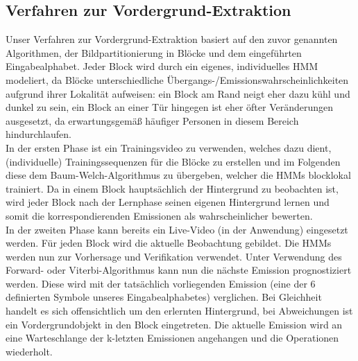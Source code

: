 \subsection{Verfahren zur Vordergrund-Extraktion}
\label{sec:verfahren}

Unser Verfahren zur Vordergrund-Extraktion basiert auf den zuvor genannten  Algorithmen, der Bildpartitionierung in Blöcke und dem eingeführten Eingabealphabet.
Jeder Block wird durch ein eigenes, individuelles HMM modeliert, da Blöcke unterschiedliche Übergangs-/Emissionswahrscheinlichkeiten aufgrund ihrer Lokalität aufweisen: ein Block am Rand neigt eher dazu kühl und dunkel zu sein, ein Block an einer Tür hingegen ist eher öfter Veränderungen ausgesetzt, da erwartungsgemäß häufiger Personen in diesem Bereich hindurchlaufen.\\
In der ersten Phase ist ein Trainingsvideo zu verwenden, welches dazu dient, (individuelle) Trainingssequenzen für die Blöcke zu erstellen und im Folgenden diese dem Baum-Welch-Algorithmus zu übergeben, welcher die HMMs blocklokal trainiert.
Da in einem Block hauptsächlich der Hintergrund zu beobachten ist, wird jeder Block nach der Lernphase seinen eigenen Hintergrund lernen und somit die korrespondierenden Emissionen als wahrscheinlicher bewerten.\\
In der zweiten Phase kann bereits ein Live-Video (in der Anwendung) eingesetzt werden.
Für jeden Block wird die aktuelle Beobachtung gebildet.
Die HMMs werden nun zur Vorhersage und Verifikation verwendet.
Unter Verwendung des Forward- oder Viterbi-Algorithmus kann nun die nächste Emission prognostiziert werden.
Diese wird mit der tatsächlich vorliegenden Emission (eine der 6 definierten Symbole unseres Eingabealphabetes) verglichen.
Bei Gleichheit handelt es sich offensichtlich um den erlernten Hintergrund, bei Abweichungen ist ein Vordergrundobjekt in den Block eingetreten.
Die aktuelle Emission wird an eine Warteschlange der k-letzten Emissionen angehangen und die Operationen wiederholt.

